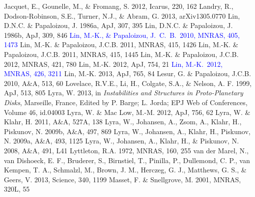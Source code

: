 \documentclass[apj]{emulateapj}
\def\blue#1{\textcolor{blue}{ #1}}
\begin{document}
\begin{thebibliography}{}
 Jacquet, E., Gounelle, M., \& Fromang, S. 2012, Icarus, 220, 162
 Landry, R., Dodson-Robinson, S.E., Turner, N.J., \& Abram, G. 2013, arXiv1305.0770
 Lin, D.N.C. \& Papaloizou, J. 1986a, ApJ, 307, 395
 Lin, D.N.C. \& Papaloizou, J. 1986b, ApJ, 309, 846
\blue{ Lin, M.-K., \& Papaloizou, J.~C.~B.\ 2010, MNRAS, 405, 1473}
 Lin, M.-K. \& Papaloizou, J.C.B. 2011, MNRAS, 415, 1426
 Lin, M.-K. \& Papaloizou, J.C.B. 2011, MNRAS, 415, 1445
 Lin, M.-K. \& Papaloizou, J.C.B. 2012, MNRAS, 421, 780
 Lin, M.-K. 2012, ApJ, 754, 21
\blue{ Lin, M.-K.\ 2012, MNRAS, 426, 3211}
 Lin, M.-K. 2013, ApJ, 765, 84
 Lesur, G. \& Papaloizou, J.C.B. 2010, A\&A, 513, 60
 Lovelace, R.V.E., Li, H., Colgate, S.A., \& Nelson, A. F. 1999, ApJ, 513, 805
 Lyra, W. 2013, in {\it Instabilities and Structures in Proto-Planetary Disks}, Marseille, France, Edited by P. Barge; L. Jorda; EPJ Web of Conferences, Volume 46, id.04003 
 Lyra, W. \& Mac Low, M.-M. 2012, ApJ, 756, 62
 Lyra, W. \& Klahr,  H. 2011, A\&A, 527A, 138
 Lyra, W., Johansen, A., Zsom, A., Klahr, H., Piskunov, N. 2009b, A\&A, 497, 869
 Lyra, W., Johansen, A., Klahr, H., Piskunov, N. 2009a, A\&A, 493, 1125 
 Lyra, W., Johansen, A., Klahr, H., \& Piskunov, N. 2008, A\&A, 491, L41
 Lyttleton, R.A. 1972, MNRAS, 160, 255
 van der Marel,
  N., van Dishoeck, E. F., Bruderer, S., Birnstiel, T., Pinilla, P.,
  Dullemond, C. P., van Kempen, T. A., Schmalzl, M., Brown, J. M., Herczeg, G. J., Matthews, G. S., \& Geers, V. 2013, Science, 340, 1199
 Masset, F. \& Snellgrove, M. 2001, MNRAS, 320L, 55

\end{thebibliography}
\end{document}
